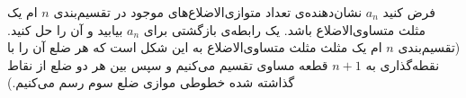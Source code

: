 \EXERCISE
فرض کنید
$a_n$
نشان‌دهنده‌ی تعداد متوازی‌الاضلاع‌های موجود در تقسیم‌بندی
$n$
ام یک مثلث متساوی‌الاضلاع باشد. یک رابطه‌ی بازگشتی برای
$a_n$
بیابید و آن را حل کنید. (تقسیم‌بندی
$n$
ام یک مثلث مثلث متساوی‌الاضلاع به این شکل است که هر ضلع آن را با نقطه‌گذاری به
$n + 1$
قطعه مساوی تقسیم می‌کنیم و سپس بین هر دو ضلع از نقاط گذاشته شده خطوطی موازی ضلع سوم رسم می‌کنیم.)